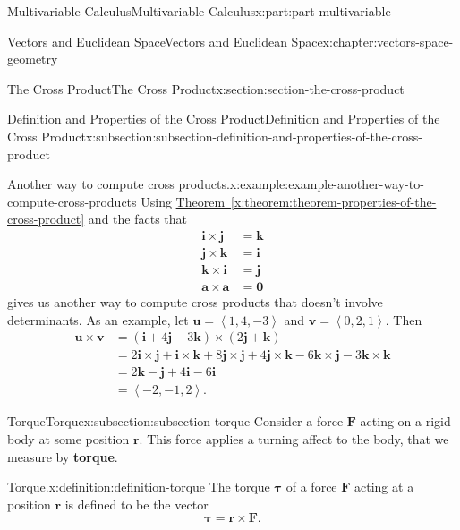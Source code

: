 \documentclass[twoside,10pt,]{tufte-book}
\newcommand{\xreffont}{\relax}
\newcommand{\terminology}[1]{\textbf{#1}}
\numberwithin{equation}{part}
\newcommand{\dotprod}[1]{\left\langle #1 \right\rangle}
\begin{document}
\begin{partptx}{Multivariable Calculus}{}{Multivariable Calculus}{}{}{x:part:part-multivariable}
\begin{chapterptx}{Vectors and Euclidean Space}{}{Vectors and Euclidean Space}{}{}{x:chapter:vectors-space-geometry}
\begin{sectionptx}{The Cross Product}{}{The Cross Product}{}{}{x:section:section-the-cross-product}
\begin{subsectionptx}{Definition and Properties of the Cross Product}{}{Definition and Properties of the Cross Product}{}{}{x:subsection:subsection-definition-and-properties-of-the-cross-product}
\begin{example}{Another way to compute cross products.}{x:example:example-another-way-to-compute-cross-products}%
Using \hyperref[x:theorem:theorem-properties-of-the-cross-product]{Theorem~{\xreffont\ref{x:theorem:theorem-properties-of-the-cross-product}}} and the facts that%
%
\begin{align*}
\mathbf{i}\times\mathbf{j} & = \mathbf{k} \\
\mathbf{j}\times\mathbf{k} & = \mathbf{i} \\
\mathbf{k}\times\mathbf{i} & = \mathbf{j} \\
\mathbf{a}\times\mathbf{a} & = \mathbf{0} 
\end{align*}
gives us another way to compute cross products that doesn't involve determinants. As an example, let \(\mathbf{u} = \dotprod{1,4,-3}\) and \(\mathbf{v} = \dotprod{0,2,1}.\) Then%
%
\begin{align*}
\mathbf{u}\times\mathbf{v} & = (\mathbf{i}+4\mathbf{j}-3\mathbf{k})\times(2\mathbf{j}+\mathbf{k}) \\
& = 2\mathbf{i}\times\mathbf{j} + \mathbf{i}\times\mathbf{k} +8\mathbf{j}\times\mathbf{j} + 4\mathbf{j}\times\mathbf{k} - 6\mathbf{k}\times\mathbf{j} -3\mathbf{k}\times\mathbf{k} \\
& = 2\mathbf{k}-\mathbf{j}+4\mathbf{i}-6\mathbf{i} \\
& = \dotprod{-2,-1,2}. 
\end{align*}
\end{example}
\end{subsectionptx}
%
%
\typeout{************************************************}
\typeout{************************************************}
%
\begin{subsectionptx}{Torque}{}{Torque}{}{}{x:subsection:subsection-torque}
Consider a force \(\mathbf{F}\) acting on a rigid body at some position \(\mathbf{r}\). This force applies a turning affect to the body, that we measure by \terminology{torque}.%
\begin{definition}{Torque.}{x:definition:definition-torque}%
%
The torque \(\boldsymbol{\tau}\) of a force \(\mathbf{F}\) acting at a position \(\mathbf{r}\) is defined to be the vector%
%
\begin{equation*}
\boldsymbol{\tau} = \mathbf{r}\times\mathbf{F}.
\end{equation*}
\end{definition}

\end{subsectionptx}
\end{sectionptx}
\end{chapterptx}
\end{partptx}
\end{document}
